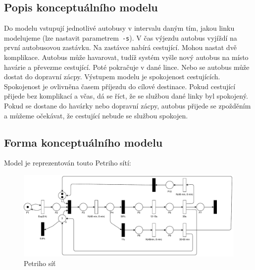 \documentclass[a4paper]{article}
\begin{document}
        \subsection{Popis konceptuálního modelu}
        \label{subsec:conceptual_model_description}
            Do modelu vstupují jednotlivé autobusy v intervalu daným tím, jakou linku modelujeme (lze nastavit parametrem~\texttt{-s}).
            V čas výjezdu autobus vyjíždí na první autobusovou zastávku. Na zastávce nabírá cestující. Mohou nastat dvě komplikace. Autobus může havarovat, tudíž systém vyšle nový autobus na místo havárie a převezme cestující. Poté pokračuje v dané lince. Nebo se autobus může dostat do dopravní zácpy. Výstupem modelu je spokojenost cestujících. Spokojenost je ovlivněna časem příjezdu do cílové destinace. Pokud cestující přijede bez komplikací a včas, dá se říct, že se službou dané linky byl spokojený. Pokud se dostane do havárky nebo dopravní zácpy, autobus přijede se zpožděním a můžeme očekávat, že cestující nebude se službou spokojen.
            
\newpage
        \subsection{Forma konceptuálního modelu}
        \label{subsec:conceptual_model}

            Model je reprezentován touto Petriho sítí:

            \begin{figure}[H]
                \includegraphics[scale=0.61, keepaspectratio]{fig/petri.pdf}
                \caption{Petriho síť}
                \label{fig:petri_nest}
            \end{figure}
\end{document}
